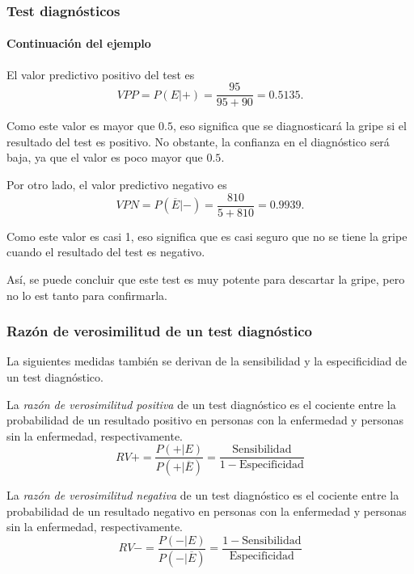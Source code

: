 	
\begin{frame}
\frametitle{Test diagnósticos}
\framesubtitle{Continuación del ejemplo}
El valor predictivo positivo del test es 
\[
	VPP = P(E|+) = \frac{95}{95+90} = 0.5135.
\]
	
Como este valor es mayor que $0.5$, eso significa que se diagnosticará la gripe si el resultado del test es positivo.
No obstante, la confianza en el diagnóstico será baja, ya que el valor es poco mayor que $0.5$.
	
Por otro lado, el valor predictivo negativo es 
\[
	VPN = P(\overline{E}|-) = \frac{810}{5+810} = 0.9939. 
\]
	
Como este valor es casi 1, eso significa que es casi seguro que no se tiene la gripe cuando el resultado del test es negativo.
	
Así, se puede concluir que este test es muy potente para descartar la gripe, pero no lo est tanto para confirmarla.
\end{frame}
	
	
\begin{frame}
\frametitle{Razón de verosimilitud de un test diagnóstico}
La siguientes medidas también se derivan de la sensibilidad y la especificidiad de un test diagnóstico.
\begin{definicion}
La \emph{razón de verosimilitud positiva} de un test diagnóstico es el cociente entre la probabilidad de un resultado positivo en personas con la enfermedad y personas sin la enfermedad, respectivamente.
\[
	RV+=\frac{P(+|E)}{P(+|\overline{E})} = \frac{\mbox{Sensibilidad}}{1-\mbox{Especificidad}}
\]
\end{definicion}
	
\begin{definicion}
La \emph{razón de verosimilitud negativa} de un test diagnóstico es el cociente entre la probabilidad de un resultado negativo en personas con la enfermedad y personas sin la enfermedad, respectivamente.
\[
	RV-=\frac{P(-|E)}{P(-|\overline{E})} = \frac{1-\mbox{Sensibilidad}}{\mbox{Especificidad}}
\]
\end{definicion}
\end{frame}
	
